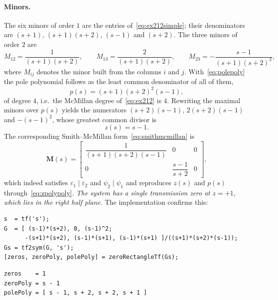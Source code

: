 \paragraph{Minors.} The six minors of order $1$ are the entries of~\eqref{eq:ex212simple}; their
denominators are $(s+1)$, $(s+1)(s+2)$, $(s-1)$ and $(s+2)$. The three minors of order $2$ are
\begin{equation}
    M_{12} = \frac{1}{(s+1)(s+2)},\qquad
    M_{13} = \frac{2}{(s+1)(s+2)},\qquad
    M_{23} = -\frac{s-1}{(s+1)(s+2)^2},
    \label{eq:minors212}
\end{equation}
where $M_{ij}$ denotes the minor built from the columns $i$ and $j$. With~\eqref{eq:polepoly} the
pole polynomial follows as the least common denominator of all of them,
\begin{equation}
    p(s) = (s+1)(s+2)^2(s-1),
    \label{eq:polepoly212}
\end{equation}
of degree $4$, i.e.\ the McMillan degree of~\eqref{eq:ex212} is $4$. Rewriting the maximal minors
over $p(s)$ yields the numerators $(s+2)(s-1)$, $2(s+2)(s-1)$ and $-(s-1)^2$, whose greatest
common divisor is
\begin{equation}
    z(s) = s-1 .
    \label{eq:zeropoly212}
\end{equation}
The corresponding Smith--McMillan form~\eqref{eq:smithmcmillan} is
\begin{equation}
    \mathbf{M}(s) = \begin{bmatrix}
        \dfrac{1}{(s+1)(s+2)(s-1)} & 0 & 0\\[10pt]
        0 & \dfrac{s-1}{s+2} & 0
    \end{bmatrix},
    \label{eq:sm212}
\end{equation}
which indeed satisfies $\varepsilon_1\mid\varepsilon_2$ and $\psi_2\mid\psi_1$ and reproduces
$z(s)$ and $p(s)$ through~\eqref{eq:zpolypoly}. \emph{The system has a single transmission zero
at $z=+1$, which lies in the right half plane.} The implementation confirms this:

\begin{lstlisting}
s  = tf('s');
G  = [ (s-1)*(s+2), 0, (s-1)^2;
      -(s+1)*(s+2), (s-1)*(s+1), (s-1)*(s+1) ]/((s+1)*(s+2)*(s-1));
Gs = tf2sym(G, 's');
[zeros, zeroPoly, polePoly] = zeroRectangleTf(Gs);
\end{lstlisting}
\begin{lstlisting}[style=matlabout]
zeros    = 1
zeroPoly = s - 1
polePoly = [ s - 1, s + 2, s + 2, s + 1 ]
\end{lstlisting}

